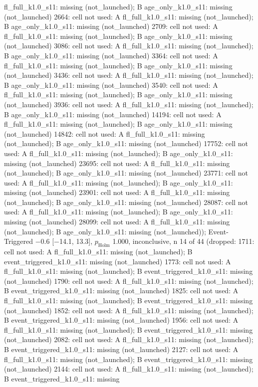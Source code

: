 \begin{table}[t]
{fl\_full\_k1.0\_s11: missing (not\_launched); B age\_only\_k1.0\_s11: missing (not\_launched) \textbar{} 2664: cell not used: A fl\_full\_k1.0\_s11: missing (not\_launched); B age\_only\_k1.0\_s11: missing (not\_launched) \textbar{} 2709: cell not used: A fl\_full\_k1.0\_s11: missing (not\_launched); B age\_only\_k1.0\_s11: missing (not\_launched) \textbar{} 3086: cell not used: A fl\_full\_k1.0\_s11: missing (not\_launched); B age\_only\_k1.0\_s11: missing (not\_launched) \textbar{} 3364: cell not used: A fl\_full\_k1.0\_s11: missing (not\_launched); B age\_only\_k1.0\_s11: missing (not\_launched) \textbar{} 3436: cell not used: A fl\_full\_k1.0\_s11: missing (not\_launched); B age\_only\_k1.0\_s11: missing (not\_launched) \textbar{} 3540: cell not used: A fl\_full\_k1.0\_s11: missing (not\_launched); B age\_only\_k1.0\_s11: missing (not\_launched) \textbar{} 3936: cell not used: A fl\_full\_k1.0\_s11: missing (not\_launched); B age\_only\_k1.0\_s11: missing (not\_launched) \textbar{} 14194: cell not used: A fl\_full\_k1.0\_s11: missing (not\_launched); B age\_only\_k1.0\_s11: missing (not\_launched) \textbar{} 14842: cell not used: A fl\_full\_k1.0\_s11: missing (not\_launched); B age\_only\_k1.0\_s11: missing (not\_launched) \textbar{} 17752: cell not used: A fl\_full\_k1.0\_s11: missing (not\_launched); B age\_only\_k1.0\_s11: missing (not\_launched) \textbar{} 23695: cell not used: A fl\_full\_k1.0\_s11: missing (not\_launched); B age\_only\_k1.0\_s11: missing (not\_launched) \textbar{} 23771: cell not used: A fl\_full\_k1.0\_s11: missing (not\_launched); B age\_only\_k1.0\_s11: missing (not\_launched) \textbar{} 23901: cell not used: A fl\_full\_k1.0\_s11: missing (not\_launched); B age\_only\_k1.0\_s11: missing (not\_launched) \textbar{} 28087: cell not used: A fl\_full\_k1.0\_s11: missing (not\_launched); B age\_only\_k1.0\_s11: missing (not\_launched) \textbar{} 28099: cell not used: A fl\_full\_k1.0\_s11: missing (not\_launched); B age\_only\_k1.0\_s11: missing (not\_launched)); Event-Triggered $-$0.6 [$-$14.1, 13.3], $p_\mathrm{Holm}$ 1.000, inconclusive, n 14 of 44 (dropped: 1711: cell not used: A fl\_full\_k1.0\_s11: missing (not\_launched); B event\_triggered\_k1.0\_s11: missing (not\_launched) \textbar{} 1773: cell not used: A fl\_full\_k1.0\_s11: missing (not\_launched); B event\_triggered\_k1.0\_s11: missing (not\_launched) \textbar{} 1790: cell not used: A fl\_full\_k1.0\_s11: missing (not\_launched); B event\_triggered\_k1.0\_s11: missing (not\_launched) \textbar{} 1825: cell not used: A fl\_full\_k1.0\_s11: missing (not\_launched); B event\_triggered\_k1.0\_s11: missing (not\_launched) \textbar{} 1852: cell not used: A fl\_full\_k1.0\_s11: missing (not\_launched); B event\_triggered\_k1.0\_s11: missing (not\_launched) \textbar{} 1956: cell not used: A fl\_full\_k1.0\_s11: missing (not\_launched); B event\_triggered\_k1.0\_s11: missing (not\_launched) \textbar{} 2082: cell not used: A fl\_full\_k1.0\_s11: missing (not\_launched); B event\_triggered\_k1.0\_s11: missing (not\_launched) \textbar{} 2127: cell not used: A fl\_full\_k1.0\_s11: missing (not\_launched); B event\_triggered\_k1.0\_s11: missing (not\_launched) \textbar{} 2144: cell not used: A fl\_full\_k1.0\_s11: missing (not\_launched); B event\_triggered\_k1.0\_s11: missing }
\end{table}
